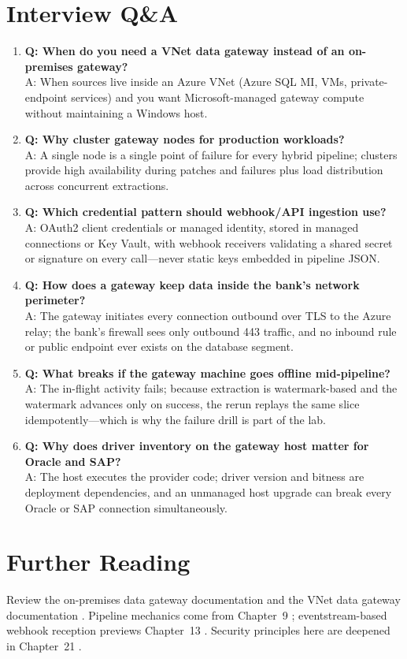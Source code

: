 \section{Interview Q\&A}
\begin{enumerate}
    \item \textbf{Q: When do you need a VNet data gateway instead of an on-premises gateway?}\\
    A: When sources live inside an Azure VNet (Azure SQL MI, VMs, private-endpoint services) and you want Microsoft-managed gateway compute without maintaining a Windows host.
    \item \textbf{Q: Why cluster gateway nodes for production workloads?}\\
    A: A single node is a single point of failure for every hybrid pipeline; clusters provide high availability during patches and failures plus load distribution across concurrent extractions.
    \item \textbf{Q: Which credential pattern should webhook/API ingestion use?}\\
    A: OAuth2 client credentials or managed identity, stored in managed connections or Key Vault, with webhook receivers validating a shared secret or signature on every call---never static keys embedded in pipeline JSON.
    \item \textbf{Q: How does a gateway keep data inside the bank's network perimeter?}\\
    A: The gateway initiates every connection outbound over TLS to the Azure relay; the bank's firewall sees only outbound 443 traffic, and no inbound rule or public endpoint ever exists on the database segment.
    \item \textbf{Q: What breaks if the gateway machine goes offline mid-pipeline?}\\
    A: The in-flight activity fails; because extraction is watermark-based and the watermark advances only on success, the rerun replays the same slice idempotently---which is why the failure drill is part of the lab.
    \item \textbf{Q: Why does driver inventory on the gateway host matter for Oracle and SAP?}\\
    A: The host executes the provider code; driver version and bitness are deployment dependencies, and an unmanaged host upgrade can break every Oracle or SAP connection simultaneously.
\end{enumerate}

\section{Further Reading}
Review the on-premises data gateway documentation \cite{microsoftOnPremGateway} and the VNet data gateway documentation \cite{microsoftVNetGateway}. Pipeline mechanics come from Chapter~9 \cite{microsoftFabricPipelines}; eventstream-based webhook reception previews Chapter~13 \cite{microsoftFabricEventstreams}. Security principles here are deepened in Chapter~21 \cite{microsoftFabricSecurity}.

